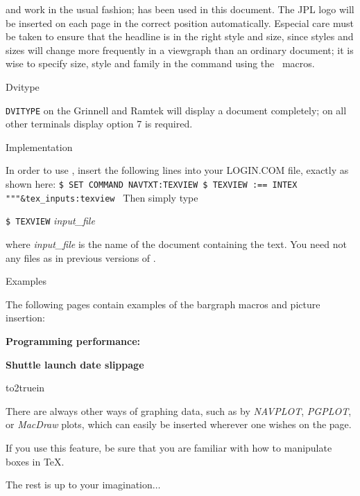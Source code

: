 \incindent

 and  work in the usual fashion; 
 has been used in this document.  The JPL logo will be 
inserted on each page in the correct position automatically.   Especial
care must be taken to ensure that the headline is in the right style and
size, since styles and sizes will change more frequently in a viewgraph
than an ordinary document; it is wise to specify size, style and family
in the  command using the \texview\ macros.

\decindent                                                           

Dvitype

\incindent

{\tt DVITYPE} on the Grinnell and Ramtek will display a {\texview} document 
completely; on all other terminals display option 7 is required.

\filbreak

\decindent

Implementation

\incindent

In order to use \texview, insert the following lines into your
LOGIN.COM file, exactly as shown here:
\medskip
{\parskip1pt\tt\obeylines\qquad\$\ SET COMMAND NAVTXT:TEXVIEW
\qquad\$\ TEXVIEW :== INTEX """\&tex\_inputs:texview
}
Then simply type

{\tt \qquad\$\ TEXVIEW} {\it input\_file}

where {\it input\_file} is the name of the document containing the
text.  You need not  any files as in previous versions
of \texview.

\decindent

\standardlines\filbreak
Examples

\incindent

The following pages contain examples of the bargraph macros and picture
insertion: 

\filbreak
\centerline{}
\vfill
\centerline{\bf Programming performance:}\medskip
{}
\endchart
\vfill\bigskip\filbreak

\centerline{}\vfill
\centerline{\bf Shuttle launch date slippage}\smallskip
{}
\endchart
\bigskip\filbreak

\noindent{}

\vbox to2truein{
There are always other ways of graphing data, such as by {\sl NAVPLOT}, {\sl
PGPLOT}, or {\sl MacDraw} plots, which can easily be inserted wherever one
wishes on the page. 

If you use this feature, be sure that you are familiar with how to 
manipulate boxes in {\TeX}.
\vfill
}

\resetleftmargin{}

The rest is up to your imagination$\ldots$
\bye
